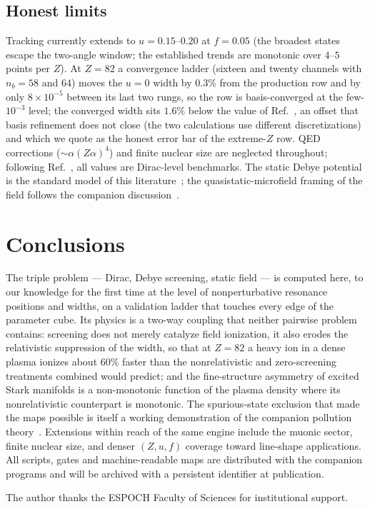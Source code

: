 \documentclass[aps,pra,twocolumn,superscriptaddress,floatfix,longbibliography]{revtex4-2}
\begin{document}
\subsection{Honest limits}

Tracking currently extends to $u=0.15$--$0.20$ at $f=0.05$ (the
broadest states escape the two-angle window; the established trends
are monotonic over $4$--$5$ points per $Z$). At $Z=82$ a
convergence ladder (sixteen and twenty channels with $n_b=58$ and
$64$) moves the $u=0$ width by $0.3\%$ from the production row and
by only $8\times10^{-5}$ between its last two rungs, so the row is
basis-converged at the few-$10^{-3}$ level; the converged width
sits $1.6\%$ below the value of Ref.~\cite{Maltsev2023}, an offset
that basis refinement does not close (the two calculations use
different discretizations) and which we quote as the honest error
bar of the extreme-$Z$ row. QED corrections
($\sim\alpha(Z\alpha)^{4}$) and finite nuclear size are neglected
throughout; following Ref.~\cite{Maltsev2023}, all values are
Dirac-level benchmarks. The static Debye potential is the standard
model of this literature~\cite{JanevZhangWang2016}; the
quasistatic-microfield framing of the field follows the companion
discussion~\cite{companionD,Griem1974}.

\section{Conclusions}

The triple problem --- Dirac, Debye screening, static field --- is
computed here, to our knowledge for the first time at the level of
nonperturbative resonance positions and widths, on a validation
ladder that touches every edge of the parameter cube. Its physics
is a two-way coupling that neither pairwise problem contains:
screening does not merely catalyze field ionization, it also erodes
the relativistic suppression of the width, so that at $Z=82$ a
heavy ion in a dense plasma ionizes about $60\%$ faster than the
nonrelativistic and zero-screening treatments combined would
predict; and the fine-structure asymmetry of excited Stark
manifolds is a non-monotonic function of the plasma density where
its nonrelativistic counterpart is monotonic. The spurious-state
exclusion that made the maps possible is itself a working
demonstration of the companion pollution
theory~\cite{companionT}. Extensions within reach of the same
engine include the muonic sector, finite nuclear size, and denser
$(Z,u,f)$ coverage toward line-shape applications. All scripts,
gates and machine-readable maps are distributed with the companion
programs and will be archived with a persistent identifier at
publication.

\begin{acknowledgments}
The author thanks the ESPOCH Faculty of Sciences for institutional
support.
\end{acknowledgments}


\end{document}
